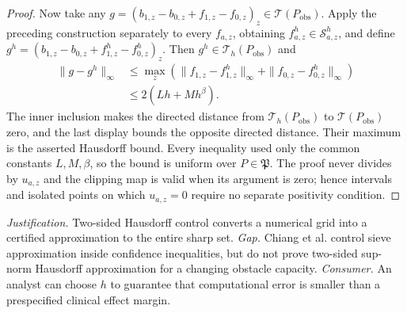 \documentclass{article}
\begin{document}
\begin{proof}
Now take any
\(g=(b_{1,z}-b_{0,z}+f_{1,z}-f_{0,z})_z\in\mathcal T(P_{\mathrm{obs}})\).
Apply the preceding construction separately to every \(f_{a,z}\), obtaining
\(f^h_{a,z}\in\mathcal S^h_{a,z}\), and define
\(g^h=(b_{1,z}-b_{0,z}+f^h_{1,z}-f^h_{0,z})_z\).  Then
\(g^h\in\mathcal T_h(P_{\mathrm{obs}})\) and
\[
\begin{aligned}
\|g-g^h\|_\infty
&\le\max_z\left(
 \|f_{1,z}-f^h_{1,z}\|_\infty+
 \|f_{0,z}-f^h_{0,z}\|_\infty\right)\\
&\le2(Lh+Mh^\beta).
\end{aligned}
\]
The inner inclusion makes the directed distance from
\(\mathcal T_h(P_{\mathrm{obs}})\) to \(\mathcal T(P_{\mathrm{obs}})\)
zero, and the last display bounds the opposite directed distance.  Their
maximum is the asserted Hausdorff bound.  Every inequality used only the
common constants \(L,M,\beta\), so the bound is uniform over
\(P\in\mathfrak P\).  The proof never divides by \(u_{a,z}\) and the clipping
map is valid when its argument is zero; hence intervals and isolated points
on which \(u_{a,z}=0\) require no separate positivity condition.
\end{proof}
\par\smallskip\noindent \textit{Justification.} Two-sided Hausdorff control converts a numerical grid into a certified approximation to the entire sharp set. \textit{Gap.} Chiang et al. control sieve approximation inside confidence inequalities, but do not prove two-sided sup-norm Hausdorff approximation for a changing obstacle capacity. \textit{Consumer.} An analyst can choose \(h\) to guarantee that computational error is smaller than a prespecified clinical effect margin.
\end{document}

